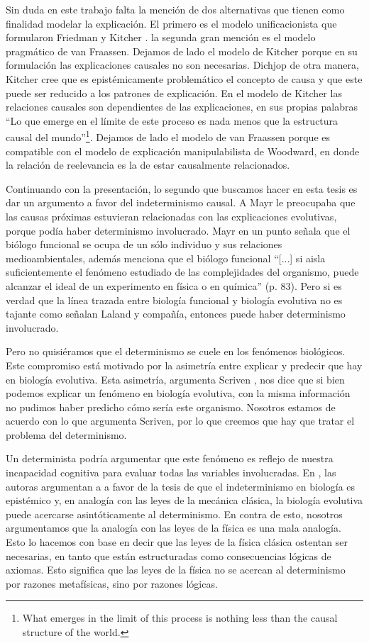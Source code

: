 Sin duda en este trabajo falta la mención de dos alternativas que tienen como finalidad modelar la explicación. El primero es el modelo unificacionista que formularon Friedman \citeyear{Friedman1974} y Kitcher \cite{Kitcher2002}. la segunda gran mención es el modelo pragmático de van Fraassen. Dejamos de lado el modelo de Kitcher porque en su formulación las explicaciones causales no son necesarias. Dichjop de otra manera, Kitcher cree que es epistémicamente problemático el concepto de causa y que este puede ser reducido a los patrones de explicación. En el modelo de Kitcher las relaciones causales son dependientes de las explicaciones, en sus propias palabras ``Lo que emerge en el límite de este proceso es nada menos que la estructura causal del mundo''\footnote{What emerges in the limit of this process is nothing less than the causal structure of the world.}. Dejamos de lado el modelo de van Fraassen porque es compatible con el modelo de explicación manipulabilista de Woodward, en donde la relación de reelevancia es la de estar causalmente relacionados.

Continuando con la presentación, lo segundo que buscamos hacer en esta tesis es dar un argumento a favor del indeterminismo causal. A Mayr le preocupaba que las causas próximas estuvieran relacionadas con las explicaciones evolutivas, porque podía haber determinismo involucrado. Mayr \cite{Mayr1998} en un punto señala que el biólogo funcional se ocupa de un sólo individuo y sus relaciones medioambientales, además menciona que el biólogo funcional ``[...] si aisla suficientemente el fenómeno estudiado de las complejidades del organismo, puede alcanzar el ideal de un experimento en física o en química'' (p. 83). Pero si es verdad que la línea trazada entre biología funcional y biología evolutiva no es tajante como señalan Laland y compañía, entonces puede haber determinismo involucrado.

Pero no quisiéramos que el determinismo se cuele en los fenómenos biológicos. Este compromiso está motivado por la asimetría entre explicar y predecir que hay en biología evolutiva. Esta asimetría, argumenta Scriven \citeyear{Scriven1959}, nos dice que si bien podemos explicar un fenómeno en biología evolutiva, con la misma información no pudimos haber predicho cómo sería este organismo. Nosotros estamos de acuerdo con lo que argumenta Scriven, por lo que creemos que hay que tratar el problema del determinismo.

Un determinista podría argumentar que este fenómeno es reflejo de nuestra incapacidad cognitiva para evaluar todas las variables involucradas. En \cite{Graves1999}, las autoras argumentan a a favor de la tesis de que el indeterminismo en biología es epistémico y, en analogía con las leyes de la mecánica clásica, la biología evolutiva puede acercarse asintóticamente al determinismo. En contra de esto, nosotros argumentamos que la analogía con las leyes de la física es una mala analogía. Esto lo hacemos con base en decir que las leyes de la física clásica ostentan ser necesarias, en tanto que están estructuradas como consecuencias lógicas de axiomas. Esto significa que las leyes de la física no se acercan al determinismo por razones metafísicas, sino por razones lógicas.

